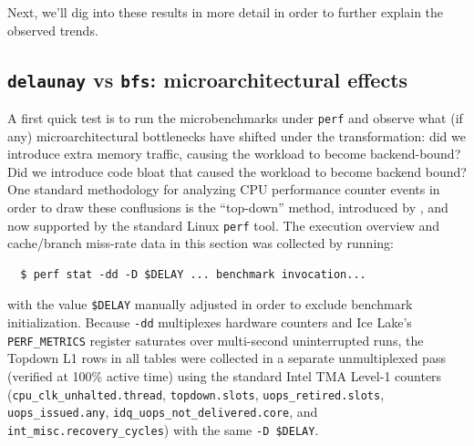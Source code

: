 Next, we'll dig into these results in more detail in order to further explain
the observed trends.



\subsection{\texttt{delaunay} vs \texttt{bfs}: microarchitectural effects}
A first quick test is to run the microbenchmarks under \texttt{perf} and observe
what (if any) microarchitectural bottlenecks have shifted under the
transformation: did we introduce extra memory traffic, causing the workload to
become backend-bound? Did we introduce code bloat that caused the workload to
become backend bound? One standard methodology for analyzing CPU performance
counter events in order to draw these conflusions is the ``top-down'' method,
introduced by \citet{topdown-paper}, and now supported by the standard Linux
\texttt{perf} tool. The execution overview and cache/branch miss-rate data in this section was collected by running:
\begin{verbatim}
  $ perf stat -dd -D $DELAY ... benchmark invocation...
\end{verbatim}
with the value \texttt{\$DELAY} manually adjusted in order to exclude benchmark
initialization. Because \texttt{-dd} multiplexes hardware counters and Ice Lake's
\texttt{PERF\_METRICS} register saturates over multi-second uninterrupted runs,
the Topdown L1 rows in all tables were collected in a separate unmultiplexed
pass (verified at 100\% active time) using the standard Intel TMA Level-1
counters (\texttt{cpu\_clk\_unhalted.thread}, \texttt{topdown.slots},
\texttt{uops\_retired.slots}, \texttt{uops\_issued.any},
\texttt{idq\_uops\_not\_delivered.core}, and \texttt{int\_misc.recovery\_cycles})
with the same \texttt{-D \$DELAY}.


